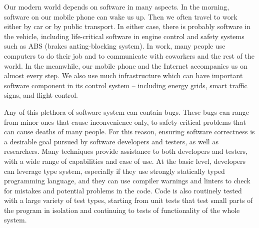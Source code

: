 Our modern world depends on software in many aspects.
In the morning, software on our mobile phone can wake us up.
Then we often travel to work either by car or by public transport.
In either case, there is probably software in the vehicle, including life-critical software in engine control and safety systems such as ABS (brakes anting-blocking system).
In work, many people use computers to do their job and to communicate with coworkers and the rest of the world.
In the meanwhile, our mobile phone and the Internet accompanies us on almost every step.
We also use much infrastructure which can have important software component in its control system -- including energy grids, smart traffic signs, and flight control.

Any of this plethora of software system can contain bugs.
These bugs can range from minor ones that cause inconvenience only, to safety-critical problems that can cause deaths of many people.
For this reason, ensuring software correctness is a desirable goal pursued by software developers and testers, as well as researchers.
Many techniques provide assistance to both developers and testers, with a wide range of capabilities and ease of use.
At the basic level, developers can leverage type system, especially if they use strongly statically typed programming language, and they can use compiler warnings and linters to check for mistakes and potential problems in the code.
Code is also routinely tested with a large variety of test types, starting from unit tests that test small parts of the program in isolation and continuing to tests of functionality of the whole system.

